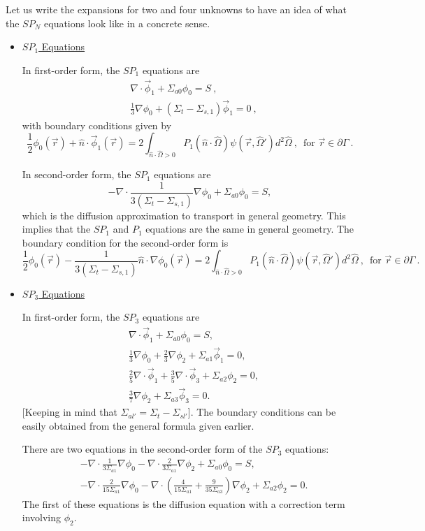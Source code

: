 \documentclass[12pt]{article}
\newcommand{\omvec}{\ensuremath{\hat{\Omega}}}
\newcommand{\sigsi}{\ensuremath{\Sigma_{s,1}}}
\begin{document}
Let us write the expansions for two and four unknowns to have an idea of what the $SP_N$ equations look like in a concrete sense.
\begin{itemize}
\item \underline{$SP_1$ Equations} 

In first-order form, the $SP_1$ equations are
\[
\begin{split}
&\nabla\cdot\vec\phi_1 + \Sigma_{a0}\phi_0 = S\:,\\
& \frac{1}{3}\nabla\phi_0+(\Sigma_t-\sigsi)\vec\phi_1=0\:,
\end{split}
\]
with boundary conditions given by
\[
\frac{1}{2}\phi_0(\vec r) +\hat n\cdot\vec\phi_1(\vec r) = 2\int_{\hat n\cdot\omvec>0}P_1(\hat n\cdot\omvec)\psi(\vec r,\omvec')d^2\omvec\:, \,\,\,\text{for $\vec r \in \partial\Gamma$}\:.
\]

In second-order form, the $SP_1$ equations are
\[
-\nabla\cdot\frac{1}{3(\Sigma_t-\sigsi)}\nabla\phi_0+\Sigma_{a0}\phi_0 = S,
\]
which is the diffusion approximation to transport in
general geometry. This implies that the $SP_1$ and $P_1$ equations are
the same in general geometry. The boundary condition for the second-order form is
\[
\frac{1}{2}\phi_0(\vec r) -\frac{1}{3(\Sigma_t-\sigsi)}\hat n\cdot\nabla\phi_0(\vec r) = 2\int_{\hat n\cdot\omvec>0}P_1(\hat n\cdot\omvec)\psi(\vec r,\omvec')d^2\omvec\:, \,\,\,\text{for $\vec r \in \partial\Gamma$}\:.
\]

\item \underline{$SP_3$ Equations} 

In first-order form, the $SP_3$ equations are
\[
\begin{split}
&\nabla\cdot\vec\phi_1 + \Sigma_{a0}\phi_0 = S,\\
& \frac{1}{3}\nabla\phi_0+\frac{2}{3}\nabla\phi_2 + \Sigma_{a1}\vec\phi_1=0,\\
& \frac{2}{5}\nabla\cdot\vec\phi_1+\frac{3}{5}\nabla\cdot\vec\phi_3 + \Sigma_{a2}\phi_2=0,\\
& \frac{3}{7}\nabla\phi_2+ \Sigma_{a3}\vec\phi_3=0.
\end{split}
\]
[Keeping in mind that $\Sigma_{al'}=\Sigma_t-\Sigma_{sl'}$].
The boundary conditions can be easily obtained from the general formula given earlier.

There are two equations in the second-order form of the $SP_3$
equations:
\[
\begin{split}
&-\nabla\cdot\frac{1}{3\Sigma_{a1}}\nabla\phi_0-\nabla\cdot\frac{2}{3\Sigma_{a1}}\nabla\phi_2 + \Sigma_{a0}\phi_0 = S,\\
&-\nabla\cdot\frac{2}{15\Sigma_{a1}}\nabla\phi_0-\nabla\cdot\left(\frac{4}{15\Sigma_{a1}}+\frac{9}{35\Sigma_{a3}}\right)\nabla\phi_2 + \Sigma_{a2}\phi_2 = 0.
\end{split}
\]
The first of these equations is the diffusion equation with a correction
term involving $\phi_2$.


\end{itemize}
\end{document}
